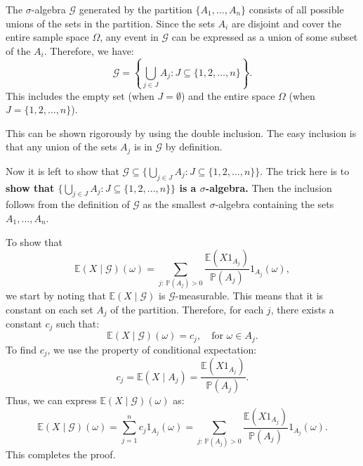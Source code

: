 \begin{answer}
    \rpos 
    \begin{answerenum}
        \item The $\sigma$-algebra $\mathcal{G}$ generated by the partition $\{A_1, \ldots, A_n\}$ consists of all possible unions of the sets in the partition. Since the sets $A_i$ are disjoint and cover the entire sample space $\Omega$, any event in $\mathcal{G}$ can be expressed as a union of some subset of the $A_i$. Therefore, we have:
            \[
            \mathcal{G} = \left\{ \bigcup_{j \in J} A_j : J \subseteq \{1, 2, \ldots, n\} \right\}.
            \]
            This includes the empty set (when $J = \emptyset$) and the entire space $\Omega$ (when $J = \{1, 2, \ldots, n\}$).

            This can be shown rigorously by using the double inclusion. The easy inclusion is that any union of the sets $A_j$ is in $\mathcal{G}$ by definition. 

            Now it is left to show that \( \mathcal{G} \subseteq \{ \bigcup_{j \in J} A_j : J \subseteq \{1, 2, \ldots, n\} \} \).
            The trick here is to \textbf{show that \( \{ \bigcup_{j \in J} A_j : J \subseteq \{1, 2, \ldots, n\} \} \) is a $\sigma$-algebra.} Then the inclusion follows from the definition of $\mathcal{G}$ as the smallest $\sigma$-algebra containing the sets \( A_1, \ldots, A_n \).

        \item To show that 
            \[
            \mathbb{E}(X \mid \mathcal{G})(\omega) = \sum_{j:\,\mathbb{P}(A_j) > 0} \frac{\mathbb{E}(X1_{A_j})}{\mathbb{P}(A_j)} 1_{A_j}(\omega),
            \]
            we start by noting that $\mathbb{E}(X \mid \mathcal{G})$ is $\mathcal{G}$-measurable. This means that it is constant on each set $A_j$ of the partition. Therefore, for each $j$, there exists a constant $c_j$ such that:
            \[
            \mathbb{E}(X \mid \mathcal{G})(\omega) = c_j, \quad \text{for } \omega \in A_j.
            \]
            To find $c_j$, we use the property of conditional expectation:
            \[
            c_j = \mathbb{E}(X \mid A_j) = \frac{\mathbb{E}(X 1_{A_j})}{\mathbb{P}(A_j)}.
            \]
            Thus, we can express $\mathbb{E}(X \mid \mathcal{G})(\omega)$ as:
            \[
            \mathbb{E}(X \mid \mathcal{G})(\omega) = \sum_{j=1}^n c_j 1_{A_j}(\omega) = \sum_{j:\,\mathbb{P}(A_j) > 0} \frac{\mathbb{E}(X1_{A_j})}{\mathbb{P}(A_j)} 1_{A_j}(\omega).
            \]
            This completes the proof.
    \end{answerenum}
\end{answer}